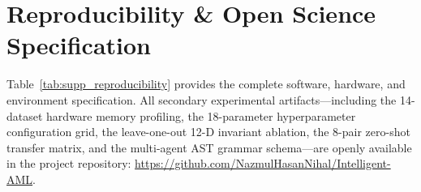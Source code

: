 \documentclass[journal,twoside]{IEEEtran}
\renewcommand{\arraystretch}{0.88}
\begin{document}
\begin{table}[htbp]
\centering
\caption{Regulatory Escalation Mapping across Conformal Triage Tiers.}
\label{tab:supp_governance_sop}
\renewcommand{\arraystretch}{0.84}
\end{table}

\section{Reproducibility \& Open Science Specification}
\label{sec:reproducibility_checklist}

Table~\ref{tab:supp_reproducibility} provides the complete software, hardware, and environment specification. All secondary experimental artifacts---including the 14-dataset hardware memory profiling, the 18-parameter hyperparameter configuration grid, the leave-one-out 12-D invariant ablation, the 8-pair zero-shot transfer matrix, and the multi-agent AST grammar schema---are openly available in the project repository: \url{https://github.com/NazmulHasanNihal/Intelligent-AML}.
\end{document}
